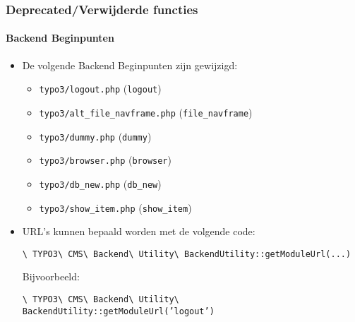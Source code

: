 \begin{frame}[fragile]
	\frametitle{Deprecated/Verwijderde functies}
	\framesubtitle{Backend Beginpunten}

	\begin{itemize}

		\item De volgende Backend Beginpunten zijn gewijzigd:

			\begin{itemize}
				\item \texttt{typo3/logout.php}					\tabto{6cm}(\begingroup\color{typo3orange}\texttt{logout}\endgroup)
				\item \texttt{typo3/alt\_file\_navframe.php}	\tabto{6cm}(\begingroup\color{typo3orange}\texttt{file\_navframe}\endgroup)
				\item \texttt{typo3/dummy.php}					\tabto{6cm}(\begingroup\color{typo3orange}\texttt{dummy}\endgroup)
				\item \texttt{typo3/browser.php}				\tabto{6cm}(\begingroup\color{typo3orange}\texttt{browser}\endgroup)
				\item \texttt{typo3/db\_new.php}				\tabto{6cm}(\begingroup\color{typo3orange}\texttt{db\_new}\endgroup)
				\item \texttt{typo3/show\_item.php}				\tabto{6cm}(\begingroup\color{typo3orange}\texttt{show\_item}\endgroup)
			\end{itemize}

		\item URL's kunnen bepaald worden met de volgende code:

			\smaller
				\texttt{\textbackslash
					TYPO3\textbackslash
					CMS\textbackslash
					Backend\textbackslash
					Utility\textbackslash
					BackendUtility::getModuleUrl(...)}
			\normalsize

			Bijvoorbeeld:

			\smaller
				\texttt{\textbackslash
					TYPO3\textbackslash
					CMS\textbackslash
					Backend\textbackslash
					Utility\textbackslash
					BackendUtility::getModuleUrl('}\begingroup\color{typo3orange}\texttt{logout}\endgroup\texttt{')}
			\normalsize

	\end{itemize}

\end{frame}


